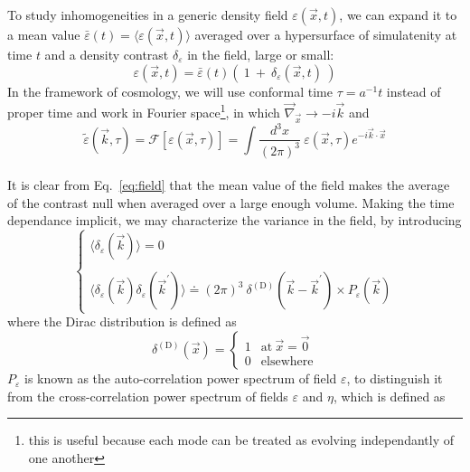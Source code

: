 To study inhomogeneities in a generic density field $\varepsilon (\vec{x}, t)$, we can expand it to a mean value $\bar{\varepsilon} (t) = \langle \varepsilon(\vec{x},t) \rangle$ averaged over a hypersurface of simulatenity at time $t$ and a density contrast $\delta_\varepsilon$ in the field, large or small:
\begin{equation}
\label{eq:field}
\varepsilon(\vec{x}, t) = \bar{\varepsilon} (t) \left( ~1 ~+~ \delta_\varepsilon (\vec{x}, t) ~ \right)
\end{equation}
In the framework of cosmology, we will use conformal time $\tau = a^{-1} t$ instead of proper time and work in Fourier space\footnote{this is useful because each mode can be treated as evolving independantly of one another}, in which $\vec{\nabla}_{\vec{x}} \rightarrow - i \vec{k}$ and
\begin{equation}
\label{def:fourier}
\tilde{\varepsilon} (\vec{k}, \tau) = \mathcal{F}\left[ \varepsilon (\vec{x}, \tau) \right] = \int \frac{d^3 x}{(2 \pi)^3}~ \varepsilon(\vec{x}, \tau) e^{-i \vec{k} \cdot \vec{x}}
\end{equation}\\
It is clear from Eq.~\ref{eq:field} that the mean value of the field makes the average of the contrast null when averaged over a large enough volume. Making the time dependance implicit, we may characterize the variance in the field, by introducing
\begin{equation}
\label{def:ps_generic}
\left\{
\begin{array}{l}
\langle \delta_\varepsilon (\vec{k}) \rangle = 0\\
\\
\langle \delta_\varepsilon (\vec{k}) \delta_\varepsilon (\vec{k}^\prime) \rangle \doteq (2 \pi)^3~\delta^{\mathrm{(D)}} (\vec{k} - \vec{k}^\prime) \times P_\varepsilon (\vec{k})
\end{array}
\right.
\end{equation} where the Dirac distribution is defined as
\begin{equation}
\label{df:dirac_distrib}
\delta^{\mathrm{(D)}} (\vec{x}) = \left\{
\begin{array}{ll}
1 & \text{at}~ \vec{x} = \vec{0}\\
0 & \text{elsewhere}
\end{array}
\right.
\end{equation} $P_\varepsilon$ is known as the auto-correlation power spectrum of field $\varepsilon$, to distinguish it from the cross-correlation power spectrum of fields $\varepsilon$ and $\eta$, which is defined as

